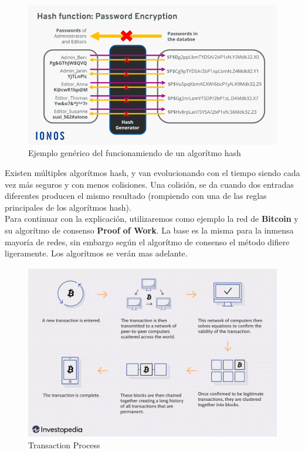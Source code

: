 \begin{figure}[h!]
  \centering
  \includegraphics[width=0.6\linewidth]{figs/EstadoArte/Blockchain/hash}
  \caption[Hash]{Ejemplo genérico del funcionamiendo de un algorítmo hash}
  \label{fig:hash}
\end{figure}

\clearpage

Existen múltiples algorítmos hash, y van evolucionando con el tiempo siendo cada vez más seguros y con menos colisiones. Una colisión, se da cuando dos entradas diferentes producen el mismo resultado (rompiendo con una de las reglas principales de los algorítmos hash). \\

Para continuar con la explicación, utilizaremos como ejemplo la red de \textbf{Bitcoin}\cite{whatIsBitcoin} y su algorítmo de consenso \textbf{Proof of Work}\cite{whatIsProofOfWork}. La base es la misma para la inmensa mayoría de redes, sin embargo según el algorítmo de consenso el método difiere ligeramente. Los algorítmos se verán mas adelante. 

\begin{figure}[h!]
  \centering
  \includegraphics[width=0.8\linewidth]{figs/EstadoArte/Blockchain/bitcoinMining}
  \caption[Bitcoin Mining]{Transaction Process}
  \label{fig:bitcoin}
\end{figure}

